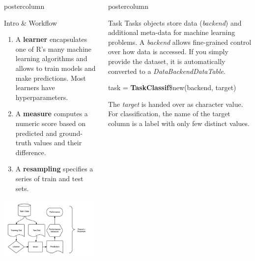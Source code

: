 \documentclass{beamer}
\newlength{\columnheight} %
\begin{document}
\begin{frame}[fragile]{}
\begin{columns}
\begin{column}{.245\textwidth}
\begin{beamercolorbox}[center]{postercolumn}
\begin{minipage}{.98\textwidth}
{\begin{myblock}{Intro \& Workflow}
\begin{enumerate}
						what the prediction target is.
						\item A \textbf{learner} encapsulates one of R's many machine learning algorithms and allows to train models and make predictions. Most learners have hyperparameters.
						\item A \textbf{measure} computes a numeric score based on predicted and ground-truth values and their difference.
						\item A \textbf{resampling} specifies a series of train and test sets.
					\end{enumerate}
				\includegraphics[width=\textwidth]{img/ml_abstraction.png}
          		\end{myblock}
				}
			\end{minipage}
		\end{beamercolorbox}
	\end{column}
	\begin{column}{.245\textwidth}
		\begin{beamercolorbox}[center]{postercolumn}
			\begin{minipage}{.98\textwidth}
				\parbox[t][\columnheight]{\textwidth}{
				  \begin{myblock}{Task}
						Tasks objects store data (\textit{backend}) and additional meta-data for machine learning problems. A \textit{backend} allows fine-grained control over how data is accessed. If you simply provide the dataset, it is automatically converted to a \textit{DataBackendDataTable}.
						\\
						\begin{codebox}
							task = \textbf{TaskClassif}\$new(backend, target)
						\end{codebox}
						The \textit{target} is handed over as character value. For classification, the name of the target column is a label with only few distinct values.

\end{myblock}}
\end{minipage}
\end{beamercolorbox}
\end{column}
\end{columns}
\end{frame}
\end{document}
